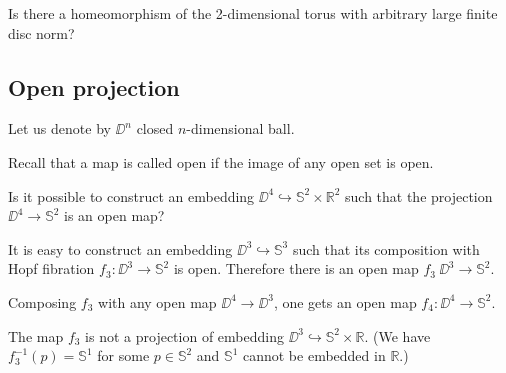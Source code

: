 \begin{pr}
Is there a homeomorphism of the 2-dimensional torus with arbitrary large finite disc norm?
\end{pr}



\subsection*{Open projection}

Let us denote by $\DD^n$ closed $n$-dimensional ball.

Recall that a map is called open if the image of any open set is open.

\begin{pr}
Is it possible to construct an embedding $\DD^4\hookrightarrow \mathbb{S}^2\times
\mathbb R^2$
such that the projection  $\DD^4\to \mathbb{S}^2$ is an open map?
\end{pr}


It is easy to construct an embedding $\DD^3\hookrightarrow \mathbb{S}^3$ such that
its composition with Hopf fibration $f_3:\DD^3\to \mathbb{S}^2$ is open.
Therefore there is an open map $f_3\:\DD^3\to\mathbb{S}^2$.

Composing $f_3$ with any open map $\DD^4\to \DD^3$,
one gets an open map $f_4:\DD^4\to \mathbb{S}^2$.

The map $f_3$ is not a projection of embedding  $\DD^3\hookrightarrow \mathbb{S}^2\times\mathbb R$.
(We have $f_3^{-1}(p)=\mathbb{S}^1$ for some $p\in \mathbb{S}^2$ and $\mathbb{S}^1$ cannot be embedded in $\mathbb R$.)  
